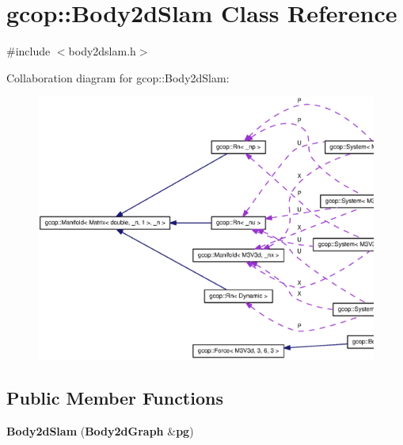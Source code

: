 \section{gcop\-:\-:\-Body2d\-Slam \-Class \-Reference}
\label{classgcop_1_1Body2dSlam}


{\ttfamily \#include $<$body2dslam.\-h$>$}



\-Collaboration diagram for gcop\-:\-:\-Body2d\-Slam\-:\nopagebreak
\begin{figure}[H]
\begin{center}
\leavevmode
\includegraphics[width=350pt]{classgcop_1_1Body2dSlam__coll__graph}
\end{center}
\end{figure}
\subsection*{\-Public \-Member \-Functions}
\begin{DoxyCompactItemize}
\item 
{\bf \-Body2d\-Slam} ({\bf \-Body2d\-Graph} \&{\bf pg})
\end{DoxyCompactItemize}
